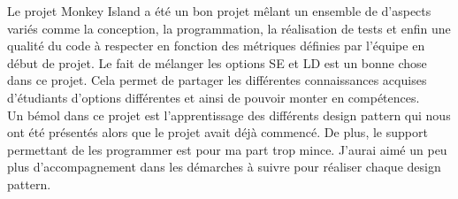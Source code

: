 Le projet Monkey Island a été un bon projet mêlant un ensemble de d’aspects variés comme la conception, la programmation, la réalisation de tests et enfin une qualité du code à respecter en fonction des métriques définies par l’équipe en début de projet.
Le fait de mélanger les options SE et LD est un bonne chose dans ce projet. Cela permet de partager les différentes connaissances acquises d’étudiants d’options différentes et ainsi de pouvoir monter en compétences.\\

Un bémol dans ce projet est l’apprentissage des différents design pattern qui nous ont été présentés alors que le projet avait déjà commencé. De plus, le support permettant de les programmer est pour ma part trop mince. J’aurai aimé un peu plus d’accompagnement dans les démarches à suivre pour réaliser chaque design pattern.
